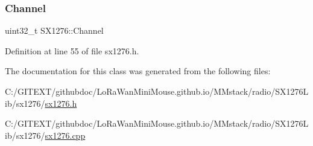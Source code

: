 \subsubsection{\texorpdfstring{Channel}{Channel}}
{\footnotesize\ttfamily uint32\+\_\+t S\+X1276\+::\+Channel}



Definition at line 55 of file sx1276.\+h.



The documentation for this class was generated from the following files\+:\begin{DoxyCompactItemize}
\item 
C\+:/\+G\+I\+T\+E\+X\+T/githubdoc/\+Lo\+Ra\+Wan\+Mini\+Mouse.\+github.\+io/\+M\+Mstack/radio/\+S\+X1276\+Lib/sx1276/\mbox{\hyperlink{sx1276_8h}{sx1276.\+h}}\item 
C\+:/\+G\+I\+T\+E\+X\+T/githubdoc/\+Lo\+Ra\+Wan\+Mini\+Mouse.\+github.\+io/\+M\+Mstack/radio/\+S\+X1276\+Lib/sx1276/\mbox{\hyperlink{sx1276_8cpp}{sx1276.\+cpp}}\end{DoxyCompactItemize}
